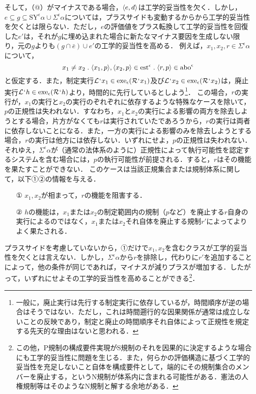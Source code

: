 そして，（@）がマイナスである場合，$ \langle e,d \rangle $は工学的妥当性を欠く．しかし，$ e\subseteq g \subseteq \mathrm{SY}^{\epsilon}\alpha\cup \varSigma^{\epsilon}\alpha $については，プラスサイドも変動するからから工学的妥当性を欠くとは限らない．ただし，$e$の評価値をプラス転換して工学的妥当性を回復した$ e' $は，それが$ g $に埋め込まれた場合に新たなマイナス要因を生成しない限り，元の$g$よりも$ (g\cap\bar{e})\cup e' $の工学的妥当性を高める．
例えば，$ x_1,x_2,r\in\varSigma^{\epsilon}\alpha $について，
\[
    x_1\neq x_2\con{1}\orp{x_1,p},\orp{x_2,p}\in\mathrm{est}^\epsilon\con{1}\orp{r,p}\in \mathrm{abo}^\epsilon
\]
と仮定する．また，制定実行$ \mathcal{L}{\mspace{1mu}{`}\mspace{1mu}} x_1\in\mathrm{exe}_{\epsilon}{(\mathcal{R}{\mspace{1mu}{`}\mspace{1mu}} x_1)} $及び$ \mathcal{L}{\mspace{1mu}{`}\mspace{1mu}} x_2\in\mathrm{exe}_{\epsilon}{(\mathcal{R}{\mspace{1mu}{`}\mspace{1mu}} x_2)} $は，廃止実行$ \mathcal{L}{\mspace{1mu}{`}\mspace{1mu}} h\in\mathrm{exe}_{\epsilon}{(\mathcal{R}{\mspace{1mu}{`}\mspace{1mu}} h)} $より，時間的に先行しているとしよう\footnote{
    一般に，廃止実行は先行する制定実行に依存しているが，時間順序が逆の場合はそうではない．ただし，これは時間遡行的な因果関係が通常は成立しないことの反映であり，制定と廃止の時間順序それ自体によって正規性を規定する先天的な理由はないと思われる．
}．
この場合，$r$の実行が，$x_1$の実行と$x_2$の実行のぞれぞれに依存するような特殊なケースを除いて，$p$の正規性は失われない．すなわち，$x_1$と$x_2$の実行による影響の両方を除去しようとする場合，片方がなくても$r$は実行されていたであろうから，$r$の実行は両者に依存しないことになる．また，一方の実行による影響のみを除去しようとする場合，$r$の実行は他方には依存しない．いずれにせよ，$p$の正規性は失われない．それゆえ，$ \varSigma^{\epsilon}\alpha $が（通常の法体系のように）正規性によって執行可能性を認定するシステムを含む場合には，$p$の執行可能性が前提される．すると，$r$はその機能を果たすことができない．
このケースは当該正規集合または規制体系に関して，以下①②の情報を与える．
\begin{enumerate}
    \item [①] $x_1,x_2$が相まって，$r$の機能を阻害する．
    \item [②] $h$の機能は，$x_1$または$x_2$の制定範囲内の規制（$p$など）を廃止する$r$自身の実行によるのではなく，$x_1$または$x_2$それ自体を廃止する規制$r'$によってよりよく果たされる．
\end{enumerate}
プラスサイドを考慮していないから，①だけで$ x_1,x_2 $を含むクラスが工学的妥当性を欠くとは言えない．しかし，$ \varSigma^{\epsilon}\alpha $から$r$を排除し，代わりに$r'$を追加することによって，他の条件が同じであれば，マイナスが減りプラスが増加する．したがって，いずれにせよその工学的妥当性を高めることができる\footnote{
    この他，P規制の構成要件実現がS規制のそれを因果的に決定するような場合にも工学的妥当性に問題を生じる．また，何らかの評価構造に基づく工学的妥当性を充足しないこと自体を構成要件として，端的にその規制集合のメンバーを廃止する，というN規制が体系内に含まれる可能性がある．憲法の人権規制等はそのようなN規制と解する余地がある．
}．

